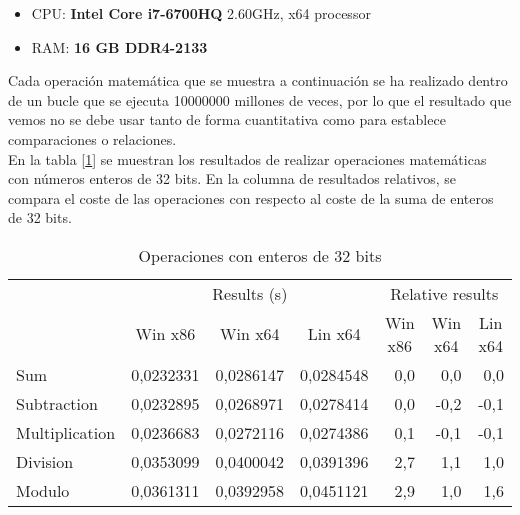 \begin{itemize}
	\item CPU: \textbf{Intel Core i7-6700HQ} 2.60GHz, x64 processor
	\item RAM: \textbf{16 GB DDR4-2133}
\end{itemize}

Cada operación matemática que se muestra a continuación se ha realizado dentro de un bucle que se ejecuta 10000000 millones de veces, por lo que el resultado que vemos no se debe usar tanto de forma cuantitativa como para establece comparaciones o relaciones.\\

En la tabla [\ref{tab:int32}] se muestran los resultados de realizar operaciones matemáticas con números enteros de 32 bits. En la columna de resultados relativos, se compara el coste de las operaciones con respecto al coste de la suma de enteros de 32 bits.\\

\begin{table}[h]
\centering
\begin{tabular}{@{}l|rrr|rrr|@{}}
\cmidrule(l){2-7}
                                     & \multicolumn{3}{c|}{Results (s)}                                                               & \multicolumn{3}{c|}{Relative results}                                                      \\ \cmidrule(l){2-7} 
                                     & \multicolumn{1}{c|}{Win x86} & \multicolumn{1}{c|}{Win x64} & \multicolumn{1}{c|}{Lin x64} & \multicolumn{1}{c|}{Win x86} & \multicolumn{1}{c|}{Win x64} & \multicolumn{1}{c|}{Lin x64} \\ \midrule
\multicolumn{1}{|l|}{Sum}            & 0,0232331                    & 0,0286147                    & 0,0284548                    & 0,0                          & 0,0                          & 0,0                          \\ \cmidrule(r){1-1}
\multicolumn{1}{|l|}{Subtraction}    & 0,0232895                    & 0,0268971                    & 0,0278414                    & 0,0                          & -0,2                         & -0,1                         \\ \cmidrule(r){1-1}
\multicolumn{1}{|l|}{Multiplication} & 0,0236683                    & 0,0272116                    & 0,0274386                    & 0,1                          & -0,1                         & -0,1                         \\ \cmidrule(r){1-1}
\multicolumn{1}{|l|}{Division}       & 0,0353099                    & 0,0400042                    & 0,0391396                    & 2,7                          & 1,1                          & 1,0                          \\ \cmidrule(r){1-1}
\multicolumn{1}{|l|}{Modulo}         & 0,0361311                    & 0,0392958                    & 0,0451121                    & 2,9                          & 1,0                          & 1,6                          \\ \bottomrule
\end{tabular}
\caption{Operaciones con enteros de 32 bits}
\label{tab:int32}
\end{table}

